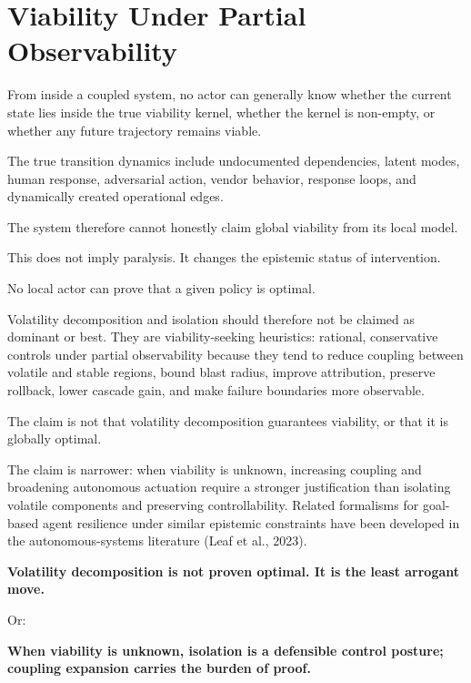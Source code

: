 \documentclass[11pt]{article}
\begin{document}
\section{Viability Under Partial Observability}

From inside a coupled system, no actor can generally know whether the current state lies inside the true viability kernel, whether the kernel is non-empty, or whether any future trajectory remains viable.

The true transition dynamics include undocumented dependencies, latent modes, human response, adversarial action, vendor behavior, response loops, and dynamically created operational edges.

The system therefore cannot honestly claim global viability from its local model.

This does not imply paralysis. It changes the epistemic status of intervention.

No local actor can prove that a given policy is optimal.

Volatility decomposition and isolation should therefore not be claimed as dominant or best. They are viability-seeking heuristics: rational, conservative controls under partial observability because they tend to reduce coupling between volatile and stable regions, bound blast radius, improve attribution, preserve rollback, lower cascade gain, and make failure boundaries more observable.

The claim is not that volatility decomposition guarantees viability, or that it is globally optimal.

The claim is narrower: when viability is unknown, increasing coupling and broadening autonomous actuation require a stronger justification than isolating volatile components and preserving controllability. Related formalisms for goal-based agent resilience under similar epistemic constraints have been developed in the autonomous-systems literature (Leaf et al., 2023).

\begin{pullquote}
\textbf{Volatility decomposition is not proven optimal. It is the least arrogant move.}
\end{pullquote}

Or:

\begin{pullquote}
\textbf{When viability is unknown, isolation is a defensible control posture; coupling expansion carries the burden of proof.}
\end{pullquote}
\end{document}
